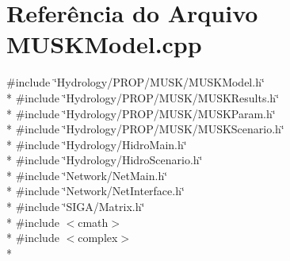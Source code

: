 \section{Referência do Arquivo M\+U\+S\+K\+Model.\+cpp}
\label{_m_u_s_k_model_8cpp}
{\ttfamily \#include \char`\"{}Hydrology/\+P\+R\+O\+P/\+M\+U\+S\+K/\+M\+U\+S\+K\+Model.\+h\char`\"{}}\\*
{\ttfamily \#include \char`\"{}Hydrology/\+P\+R\+O\+P/\+M\+U\+S\+K/\+M\+U\+S\+K\+Results.\+h\char`\"{}}\\*
{\ttfamily \#include \char`\"{}Hydrology/\+P\+R\+O\+P/\+M\+U\+S\+K/\+M\+U\+S\+K\+Param.\+h\char`\"{}}\\*
{\ttfamily \#include \char`\"{}Hydrology/\+P\+R\+O\+P/\+M\+U\+S\+K/\+M\+U\+S\+K\+Scenario.\+h\char`\"{}}\\*
{\ttfamily \#include \char`\"{}Hydrology/\+Hidro\+Main.\+h\char`\"{}}\\*
{\ttfamily \#include \char`\"{}Hydrology/\+Hidro\+Scenario.\+h\char`\"{}}\\*
{\ttfamily \#include \char`\"{}Network/\+Net\+Main.\+h\char`\"{}}\\*
{\ttfamily \#include \char`\"{}Network/\+Net\+Interface.\+h\char`\"{}}\\*
{\ttfamily \#include \char`\"{}S\+I\+G\+A/\+Matrix.\+h\char`\"{}}\\*
{\ttfamily \#include $<$cmath$>$}\\*
{\ttfamily \#include $<$complex$>$}\\*
